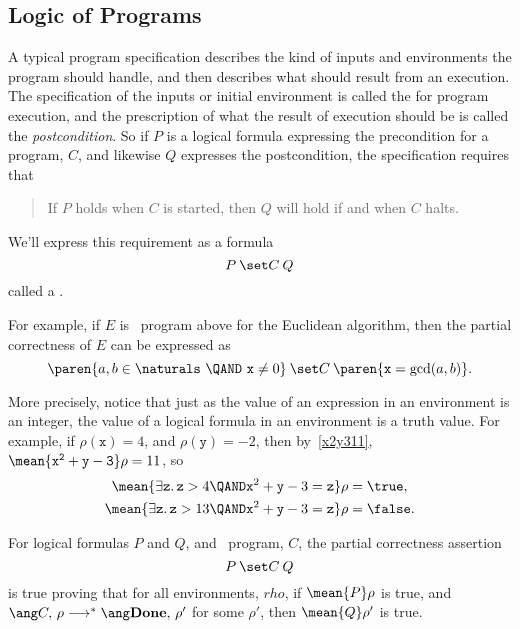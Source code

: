 \begin{problems}
\homeworkproblems
{}
\end{problems}

\subsection{Logic of Programs}

A typical program specification describes the kind of inputs and
environments the program should handle, and then describes what should
result from an execution.  The specification of the inputs or initial
environment is called the  for program execution, and
the prescription of what the result of execution should be is called the
\emph{postcondition}.  So if $P$ is a logical formula expressing the precondition
for a program, $C$, and likewise $Q$ expresses the postcondition, the
specification requires that
\begin{quote}
If $P$ holds when $C$ is started, then $Q$ will hold if and when $C$ halts.
\end{quote}
We'll express this requirement as a formula
\[
\after{P}{C}{Q}
\]
called a .

For example, if $E$ is \while\ program above for the Euclidean
algorithm, then the partial correctness of $E$ can be expressed as
\begin{equation}\label{eucpc}
\after{\paren{a, b \in \naturals\ \QAND\  \mathtt{x} \neq 0}}{C}
                   {\paren{\mathtt{x} = \gcd(a,b)}}.
\end{equation}

More precisely, notice that just as the value of an expression in an
environment is an integer, the value of a logical formula in an
environment is a truth value.  For example, if $\rho(\mathtt{x}) =4$,
and $\rho(\mathtt{y}) =-2$, then by~\eqref{x2y311},
$\mean{\mathtt{x^2+y -3}}\rho = 11$, so
\begin{align*}
\mean{\exists \mathtt{z}.\, \mathtt{z} > 4 \QAND \mathtt{x}^2+\mathtt{y} -3=\mathtt{z}}\rho & = \true,\\
\mean{\exists \mathtt{z}.\, \mathtt{z} > 13 \QAND \mathtt{x}^2+\mathtt{y} -3=\mathtt{z}}\rho & = \false.
\end{align*}

\begin{definition}\label{def_afterPCQ}
For logical formulas $P$ and $Q$, and \while\ program, $C$, the partial correctness assertion
\[
\after{P}{C}{Q}
\]
is true proving that for all environments, $rho$, if $\mean{P}\rho$ is
true, and $\haltswith{C}{\rho}{\rho'}$ for some $\rho'$, then
$\mean{Q}\rho'$ is true.
\end{definition}

